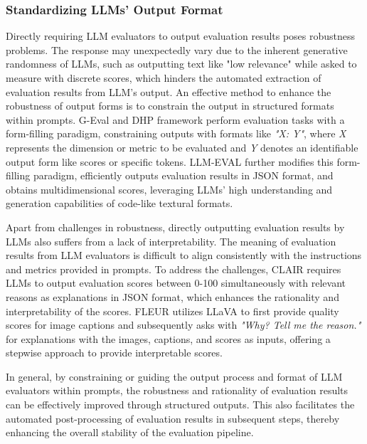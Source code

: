 \subsubsection{\textbf{Standardizing LLMs' Output Format}}
\label{subsubsec:design_output}

Directly requiring LLM evaluators to output evaluation results poses robustness problems. 
The response may unexpectedly vary due to the inherent generative randomness of LLMs, such as outputting text like "low relevance" while asked to measure with discrete scores, which hinders the automated extraction of evaluation results from LLM's output. 
An effective method to enhance the robustness of output forms is to constrain the output in structured formats within prompts. G-Eval\cite{geval} and DHP framework\cite{dhp} perform evaluation tasks with a form-filling paradigm, constraining outputs with formats like \textit{"X: Y"}, where \textit{X} represents the dimension or metric to be evaluated and \textit{Y} denotes an identifiable output form like scores or specific tokens. LLM-EVAL\cite{llmeval} further modifies this form-filling paradigm, efficiently outputs evaluation results in JSON format, and obtains multidimensional scores, leveraging LLMs' high understanding and generation capabilities of code-like textural formats.

Apart from challenges in robustness, directly outputting evaluation results by LLMs also suffers from a lack of interpretability. The meaning of evaluation results from LLM evaluators is difficult to align consistently with the instructions and metrics provided in prompts. To address the challenges, CLAIR\cite{chan2023clair} requires LLMs to output evaluation scores between 0-100 simultaneously with relevant reasons as explanations in JSON format, which enhances the rationality and interpretability of the scores. FLEUR\cite{lee-etal-2024-fleur} utilizes LLaVA to first provide quality scores for image captions and subsequently asks with \textit{"Why? Tell me the reason."} for explanations with the images, captions, and scores as inputs, offering a stepwise approach to provide interpretable scores. 

In general, by constraining or guiding the output process and format of LLM evaluators within prompts, the robustness and rationality of evaluation results can be effectively improved through structured outputs. This also facilitates the automated post-processing of evaluation results in subsequent steps, thereby enhancing the overall stability of the evaluation pipeline.


